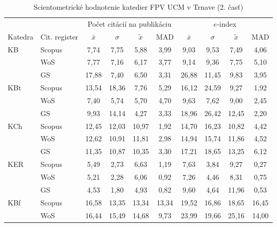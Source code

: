 \begin{table}
  \centering\small
  \caption[Hodnotenie FPV\,--\,počet citácií na publikáciu a $e$-index]{Scientometrické hodnotenie katedier FPV UCM v Trnave (2. časť)}
\label{tab:2-staff.results}
\begin{tabularx}{\textwidth}{XXcccc@{\hspace{3ex}}cccc}
  \toprule\noalign{\vspace{.3ex}}
           &       & \multicolumn{4}{c}{Počet citácií na publikáciu} &  \multicolumn{4}{c}{$e$-index} \\
 Katedra  & Cit. register & $\bar{x}$      & $\sigma$  & $\tilde{x}$ & MAD  & $\bar{x}$      & $\sigma$  & $\tilde{x}$  & MAD  \\[0.3ex]
  \midrule\noalign{\vspace{.5ex}}
 KB   & Scopus & 7,74        & 7,75  & 5,88  & 3,99  & 9,03    & 9,53  & 7,49  & 4,06  \\
      & WoS    & 7,77        & 7,16  & 6,17  & 3,77  & 9,14    & 9,36  & 7,75  & 5,10  \\
      & GS     & 17,88       & 7,40  & 6,50  & 3,31  & 26,88   & 11,45 & 9,83  & 3,95  \\[3ex]
 KBt  & Scopus & 13,54       & 18,36 & 7,76  & 5,29  & 16,12   & 24,59 & 9,27  & 1,92  \\
      & WoS    & 7,40        & 5,74  & 5,70  & 4,70  & 9,63    & 7,62  & 9,00  & 2,45  \\
      & GS     & 9,93        & 14,14 & 4,27  & 3,33  & 18,96   & 26,42 & 12,45 & 2,20  \\[3ex]
 KCh  & Scopus & 12,45       & 12,03 & 10,97 & 1,92  & 14,70   & 16,23 & 10,82 & 4,42  \\
      & WoS    & 12,62       & 10,91 & 11,81 & 2,98  & 14,94   & 15,74 & 11,86 & 4,52  \\
      & GS     & 11,35       & 10,87 & 10,35 & 3,30  & 17,21   & 18,65 & 13,25 & 6,12  \\[3ex]
 KER  & Scopus & 5,49        & 2,73  & 6,63  & 1,19  & 7,63    & 3,84  & 9,27  & 0,27  \\
      & WoS    & 5,21        & 2,28  & 6,06  & 0,92  & 7,26    & 4,46  & 8,31  & 0,75  \\
      & GS     & 4,53        & 1,80  & 4,93  & 0,82  & 9,60    & 4,64  & 11,96 & 0,53  \\[3ex]
 KBf  & Scopus & 16,58       & 13,35 & 13,34 & 13,34 & 19,52   & 16,86 & 18,65 & 16,45 \\
      & WoS    & 16,44       & 15,49 & 14,68 & 9,73  & 23,99   & 19,66 & 25,16 & 14,00 \\

\end{tabularx}
\end{table}
